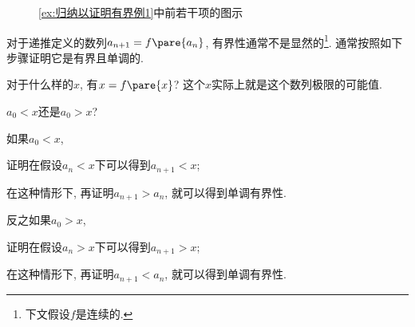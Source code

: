 \documentclass{ctexart}
\begin{document}
\begin{figure}[ht]
    \centering
    \begin{subfigure}{5cm}
        \centering
    \end{subfigure}
    \begin{subfigure}{5cm}
        \centering
    \end{subfigure}
    \begin{subfigure}{5cm}
        \centering
    \end{subfigure}
    \begin{subfigure}{5cm}
        \centering
    \end{subfigure}
    \caption{\cref{ex:归纳以证明有界例1}中前若干项的图示}
    \label{fig:归纳以证明有界例1中前若干项的图示}
\end{figure}
对于递推定义的数列$a_{n+1} = f\pare{a_n}$, 有界性通常不是显然的\footnote{下文假设$f$是连续的.}. 通常按照如下步骤证明它是有界且单调的.
\begin{cenum}
    \item 对于什么样的$x$, 有$x = f\pare{x}$? 这个$x$实际上就是这个数列极限的可能值.
    \item $a_0<x$还是$a_0>x$?
    \item 如果$a_0 < x$,
    \begin{cenum}
        \item 证明在假设$a_n < x$下可以得到$a_{n+1} < x$;
        \item 在这种情形下, 再证明$a_{n+1}>a_n$, 就可以得到单调有界性.
    \end{cenum}
    \item 反之如果$a_0 > x$,
    \begin{cenum}
        \item 证明在假设$a_n > x$下可以得到$a_{n+1} > x$;
        \item 在这种情形下, 再证明$a_{n+1}<a_n$, 就可以得到单调有界性.
    \end{cenum}
\end{cenum}
\end{document}
